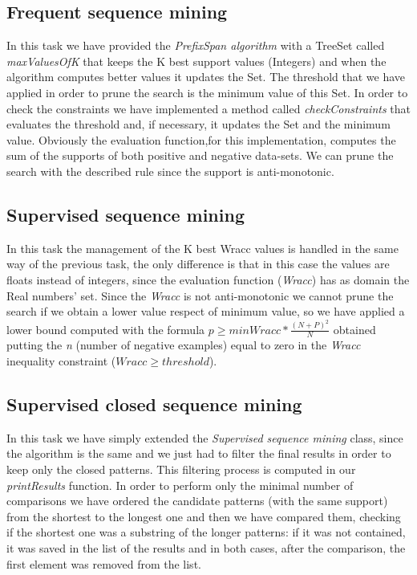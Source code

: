 \documentclass[10pt, a4paper]{article}
\begin{document}
	\subsection{Frequent sequence mining}
	In this task we have provided the \textit{PrefixSpan algorithm} with a TreeSet called \textit{maxValuesOfK} that keeps the K best support values (Integers) and when the algorithm computes better values it updates the Set. The threshold that we have applied in order to prune the search is the minimum value of this Set.\newline
	In order to check the constraints we have implemented a method called \textit{checkConstraints} that evaluates the threshold and, if necessary, it updates the Set and the minimum value. Obviously the evaluation function,for this implementation, computes the sum of the supports of both positive and negative data-sets.
	We can prune the search with the described rule since the support is anti-monotonic.

	\subsection{Supervised sequence mining}
	In this task the management of the K best Wracc values is handled in the same way of the previous task, the only difference is that in this case the values are floats instead of integers, since the evaluation function (\textit{Wracc}) has as domain the Real numbers' set.
	Since the \textit{Wracc} is not anti-monotonic we cannot prune the search if we obtain a lower value respect of minimum value, so we have applied a lower bound computed with the formula $p\geq minWracc*\frac{(N+P)^2}{N}$ obtained putting the \textit{n} (number of negative examples) equal to zero in the \textit{Wracc} inequality constraint ($Wracc \geq threshold$).
	
	\subsection{Supervised closed sequence mining}
	In this task we have simply extended the \textit{Supervised sequence mining} class, since the algorithm is the same and we just had to filter the final results in order to keep only the closed patterns.
	This filtering process is computed in our \textit{printResults} function. In order to perform only the minimal number of comparisons we have ordered the candidate patterns (with the same support) from the shortest to the longest one and then we have compared them, checking if the shortest one was a substring of the longer patterns: if it was not contained, it was saved in the list of the results and in both cases, after the comparison, the first element was removed from the list.	
		
\end{document}
